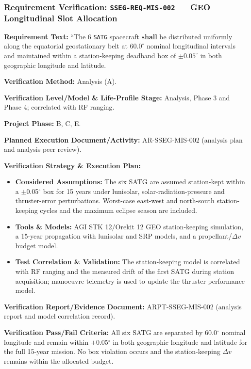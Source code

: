 \subsubsection{Requirement Verification: \texttt{SSEG-REQ-MIS-002} --- GEO Longitudinal Slot Allocation}
\label{ver:SSEG-REQ-MIS-002}
\textbf{Requirement Text:} ``The 6 \texttt{SATG} spacecraft \textbf{shall} be distributed uniformly along the equatorial geostationary belt at $60.0^\circ$ nominal longitudinal intervals and maintained within a station-keeping deadband box of $\pm 0.05^\circ$ in both geographic longitude and latitude.
\par\textbf{Verification Method:} Analysis (A).
\par\textbf{Verification Level/Model \& Life-Profile Stage:} Analysis, Phase 3 and Phase 4; correlated with RF ranging.
\par\textbf{Project Phase:} B, C, E.
\par\textbf{Planned Execution Document/Activity:} AR-SSEG-MIS-002 (analysis plan and analysis peer review).
\par\textbf{Verification Strategy \& Execution Plan:}
\begin{itemize}
\item \textbf{Considered Assumptions:} The six SATG are assumed station-kept within a $\pm$0.05$^\circ$ box for 15 years under lunisolar, solar-radiation-pressure and thruster-error perturbations. Worst-case east-west and north-south station-keeping cycles and the maximum eclipse season are included.
\item \textbf{Tools \& Models:} AGI STK 12/Orekit 12 GEO station-keeping simulation, a 15-year propagation with lunisolar and SRP models, and a propellant/$\Delta v$ budget model.
\item \textbf{Test Correlation \& Validation:} The station-keeping model is correlated with RF ranging and the measured drift of the first SATG during station acquisition; manoeuvre telemetry is used to update the thruster performance model.
\end{itemize}
\par\textbf{Verification Report/Evidence Document:} ARPT-SSEG-MIS-002 (analysis report and model correlation record).
\par\textbf{Verification Pass/Fail Criteria:} All six SATG are separated by 60.0$^\circ$ nominal longitude and remain within $\pm$0.05$^\circ$ in both geographic longitude and latitude for the full 15-year mission. No box violation occurs and the station-keeping $\Delta v$ remains within the allocated budget.
\par\medskip
